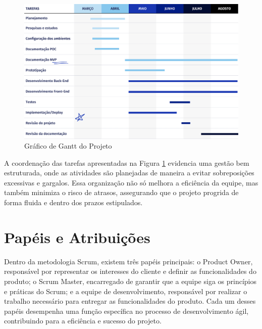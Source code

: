 \begin{figure}[ht]
        \centering
        \includegraphics[scale=0.2]{images/grafico-gantt.png}        
        \caption{Gráfico de Gantt do Projeto}
        \label{fig:graficoGantt}
\end{figure}

\newpage

 A coordenação das tarefas apresentadas na Figura \ref{fig:graficoGantt} evidencia uma gestão bem estruturada, onde as atividades são planejadas de maneira a evitar sobreposições excessivas e gargalos. Essa organização não só melhora a eficiência da equipe, mas também minimiza o risco de atrasos, assegurando que o projeto progrida de forma fluida e dentro dos prazos estipulados.

\section{Papéis e Atribuições}

Dentro da metodologia Scrum, existem três papéis principais: o Product Owner, responsável por representar os interesses do cliente e definir as funcionalidades do produto; o Scrum Master, encarregado de garantir que a equipe siga os princípios e práticas do Scrum; e a equipe de desenvolvimento, responsável por realizar o trabalho necessário para entregar as funcionalidades do produto. Cada um desses papéis desempenha uma função específica no processo de desenvolvimento ágil, contribuindo para a eficiência e sucesso do projeto.


